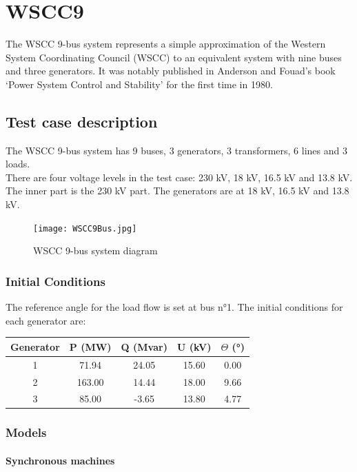 \documentclass[a4paper, 12pt]{report}
\begin{document}
\chapter{WSCC9}

The WSCC 9-bus system represents a simple approximation of the Western System Coordinating Council (WSCC) to an equivalent system with nine buses and three generators.
It was notably published in Anderson and Fouad’s book ‘Power System Control and Stability’ for the first time in 1980.

\section{Test case description}

The WSCC 9-bus system has 9 buses, 3 generators, 3 transformers, 6 lines and 3 loads.  \\
There are four voltage levels in the test case: 230 kV, 18 kV, 16.5 kV and 13.8 kV. The inner
part is the 230 kV part. The generators are at 18 kV, 16.5 kV and 13.8 kV.

\begin{figure}[H]
  \texttt{[image: WSCC9Bus.jpg]}
  \caption{WSCC 9-bus system diagram}
\end{figure}

\subsection{Initial Conditions}

The reference angle for the load flow is set at bus n°1. The initial conditions for each generator
are:
\begin{center}
\begin{tabular}{|c|c|c|c|c|}
  \hline
  Generator & P (MW) & Q (Mvar) & U (kV) & $\Theta$ (°) \\
  \hline
  1 & 71.94 & 24.05 & 15.60 & 0.00\\
  2 & 163.00 & 14.44 & 18.00 & 9.66\\
  3 & 85.00 & -3.65 & 13.80 & 4.77\\
  \hline
\end{tabular}
\end{center}

\subsection{Models}

\subsubsection{Synchronous machines}
\end{document}
